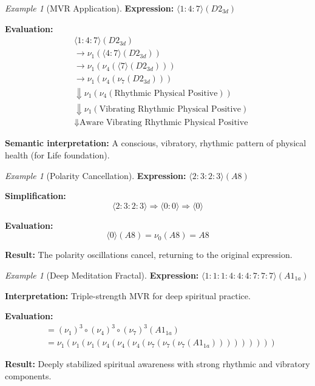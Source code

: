 \documentclass[11pt,twoside,openright]{book}
\theoremstyle{definition}
\theoremstyle{plain}
\theoremstyle{remark}
\newtheorem{example}[definition]{Example}
\newcommand{\noe}[1]{\nu_{#1}}
\newcommand{\smallstep}{\to}
\newcommand{\bigstep}{\Downarrow}
\begin{document}
\begin{example}[MVR Application]
\label{ex:mvr-application}
\textbf{Expression:} $\langle 1 : 4 : 7 \rangle(D2_{3d})$

\textbf{Evaluation:}
\begin{align}
&\langle 1 : 4 : 7 \rangle(D2_{3d}) \\
&\smallstep \noe{1}(\langle 4 : 7 \rangle(D2_{3d})) \\
&\smallstep \noe{1}(\noe{4}(\langle 7 \rangle(D2_{3d}))) \\
&\smallstep \noe{1}(\noe{4}(\noe{7}(D2_{3d}))) \\
&\bigstep \noe{1}(\noe{4}(\text{Rhythmic Physical Positive})) \\
&\bigstep \noe{1}(\text{Vibrating Rhythmic Physical Positive}) \\
&\bigstep \text{Aware Vibrating Rhythmic Physical Positive}
\end{align}

\textbf{Semantic interpretation:} A conscious, vibratory, rhythmic pattern of physical health (for Life foundation).
\end{example}

\begin{example}[Polarity Cancellation]
\label{ex:polarity-cancel}
\textbf{Expression:} $\langle 2 : 3 : 2 : 3 \rangle(A8)$

\textbf{Simplification:}
\[
\langle 2 : 3 : 2 : 3 \rangle \Rightarrow \langle 0 : 0 \rangle \Rightarrow \langle 0 \rangle
\]

\textbf{Evaluation:}
\[
\langle 0 \rangle(A8) = \noe{0}(A8) = A8
\]

\textbf{Result:} The polarity oscillations cancel, returning to the original expression.
\end{example}

\begin{example}[Deep Meditation Fractal]
\label{ex:deep-meditation}
\textbf{Expression:} $\langle 1 : 1 : 1 : 4 : 4 : 4 : 7 : 7 : 7 \rangle(A1_{1a})$

\textbf{Interpretation:} Triple-strength MVR for deep spiritual practice.

\textbf{Evaluation:}
\begin{align}
&= (\noe{1})^3 \circ (\noe{4})^3 \circ (\noe{7})^3 (A1_{1a}) \\
&= \noe{1}(\noe{1}(\noe{1}(\noe{4}(\noe{4}(\noe{4}(\noe{7}(\noe{7}(\noe{7}(A1_{1a})))))))))
\end{align}

\textbf{Result:} Deeply stabilized spiritual awareness with strong rhythmic and vibratory components.
\end{example}
\end{document}
